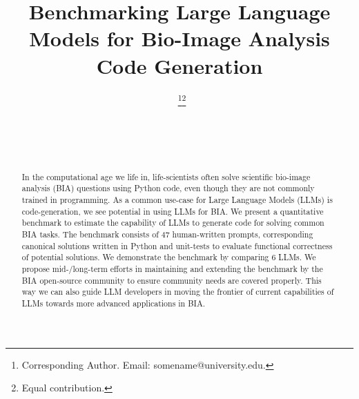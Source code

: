 \documentclass{ecai}
\begin{document}

\begin{frontmatter}




\title{Benchmarking Large Language Models for Bio-Image Analysis Code Generation}


\author[A]{~\thanks{Corresponding Author. Email: somename@university.edu.}\footnote{Equal contribution.}}
\author[B]{~\footnotemark}
\author[B,C]{~} 

\address[A]{Short Affiliation of First Author}
\address[B]{Short Affiliation of Second Author and Third Author}
\address[C]{Short Alternate Affiliation of Third Author}


\begin{abstract}
In the computational age we life in, life-scientists often solve scientific bio-image analysis (BIA) questions using Python code, even though they are not commonly trained in programming. As a common use-case for Large Language Models (LLMs) is code-generation, we see potential in using LLMs for BIA. We present a quantitative benchmark to estimate the capability of LLMs to generate code for solving common BIA tasks. The benchmark consists of 47 human-written prompts, corresponding canonical solutions written in Python and unit-tests to evaluate functional correctness of potential solutions. We demonstrate the benchmark by comparing 6 LLMs. We propose mid-/long-term efforts in maintaining and extending the benchmark by the BIA open-source community to ensure community needs are covered properly. This way we can also guide LLM developers in moving the frontier of current capabilities of LLMs towards more advanced applications in BIA. 
\end{abstract}

\end{frontmatter}
\end{document}
